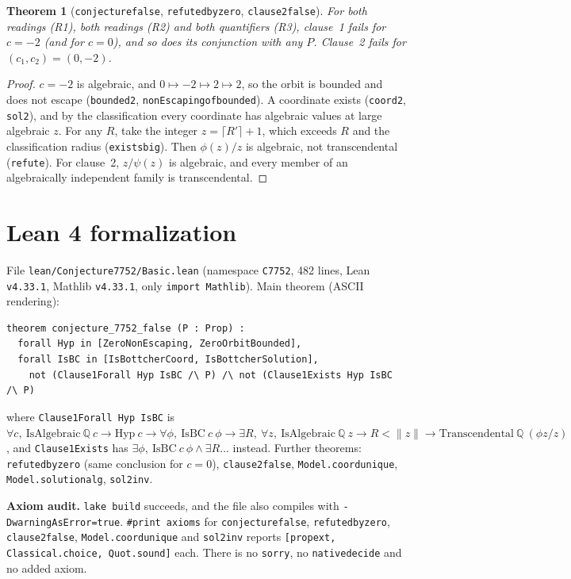 \documentclass[11pt]{article}
\newtheorem{theorem}{Theorem}
\theoremstyle{definition}
\theoremstyle{remark}
\renewcommand{\_}{\oldus\allowbreak}
\begin{document}
\begin{theorem}[\texttt{conjecture\_7752\_false}, \texttt{refuted\_by\_zero}, \texttt{clause2\_false}]
For both readings (R1), both readings (R2) and both quantifiers (R3), clause~1 fails for $c=-2$ (and for
$c=0$), and so does its conjunction with any $P$. Clause~2 fails for $(c_1,c_2)=(0,-2)$.
\end{theorem}
\begin{proof}
$c=-2$ is algebraic, and $0\mapsto-2\mapsto2\mapsto2$, so the orbit is bounded and does not escape
(\texttt{bounded2}, \texttt{nonEscaping\_of\_bounded}). A coordinate exists (\texttt{coord2},
\texttt{sol2}), and by the classification every coordinate has algebraic values at large algebraic $z$.
For any $R$, take the integer $z=\lceil R'\rceil+1$, which exceeds $R$ and the classification radius
(\texttt{exists\_big}). Then $\phi(z)/z$ is algebraic, not transcendental (\texttt{refute}). For
clause~2, $z/\psi(z)$ is algebraic, and every member of an algebraically independent family is
transcendental.
\end{proof}

\section{Lean 4 formalization}\label{sec:lean}

File \texttt{lean/Conjecture7752/Basic.lean} (namespace \texttt{C7752}, 482 lines, Lean
\texttt{v4.33.1}, Mathlib \texttt{v4.33.1}, only \texttt{import Mathlib}). Main theorem (ASCII rendering):
\begin{verbatim}
theorem conjecture_7752_false (P : Prop) :
  forall Hyp in [ZeroNonEscaping, ZeroOrbitBounded],
  forall IsBC in [IsBottcherCoord, IsBottcherSolution],
    not (Clause1Forall Hyp IsBC /\ P) /\ not (Clause1Exists Hyp IsBC /\ P)
\end{verbatim}
where \texttt{Clause1Forall Hyp IsBC} is
$\forall c,\ \mathrm{IsAlgebraic}\ \mathbb{Q}\ c\to\mathrm{Hyp}\ c\to\forall\phi,\ \mathrm{IsBC}\ c\ \phi\to
\exists R,\ \forall z,\ \mathrm{IsAlgebraic}\ \mathbb{Q}\ z\to R<\|z\|\to
\mathrm{Transcendental}\ \mathbb{Q}\ (\phi z/z)$, and \texttt{Clause1Exists} has $\exists\phi,\
\mathrm{IsBC}\ c\ \phi\wedge\exists R\ldots$ instead. Further theorems: \texttt{refuted\_by\_zero}
(same conclusion for $c=0$), \texttt{clause2\_false}, \texttt{Model.coord\_unique},
\texttt{Model.solution\_alg}, \texttt{sol2\_inv}.

\textbf{Axiom audit.} \texttt{lake build} succeeds, and the file also compiles with
\texttt{-DwarningAsError=true}. \texttt{\#print axioms} for \texttt{conjecture\_7752\_false},
\texttt{refuted\_by\_zero}, \texttt{clause2\_false}, \texttt{Model.coord\_unique} and \texttt{sol2\_inv}
reports \texttt{[propext, Classical.choice, Quot.sound]} each. There is no \texttt{sorry}, no
\texttt{native\_decide} and no added axiom.
\end{document}
